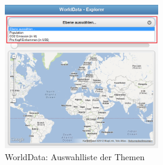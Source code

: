 \begin{figure}[H]
	\centering
	\includegraphics[width=0.6\textwidth]{images/usecase1-worlddata/documentation/worlddata-application_start}
	\caption{WorldData: Auswahlliste der Themen}
	\label{worlddata-application_start}
\end{figure}